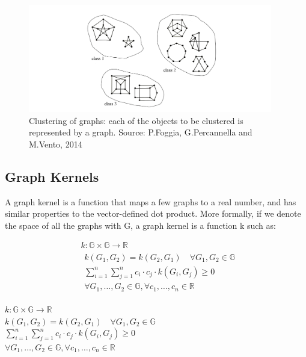 \begin{figure}[h]
\centering
\includegraphics[width=0.95\textwidth,center]{picture/figure6.png}
\caption[Miniaturtrichter]{Clustering of graphs: each of the objects to be clustered is represented by a graph. Source: P.Foggia, G.Percannella and M.Vento, 2014}
\label{fig:clusteringgraphs}
\end{figure}


\subsection{Graph Kernels}
A graph kernel is a function that maps a few graphs to a real number, and has similar properties to the vector-defined dot product. More formally, if we denote the space of all the graphs with G, a graph kernel is a function k such as:

\begin{equation}
\begin{aligned}
&k: \mathbb{G} \times \mathbb{G} \longrightarrow \mathbb{R}\\
&\begin{gathered}
k\left(G_{1}, G_{2}\right)=k\left(G_{2}, G_{1}\right) \quad \forall G_{1}, G_{2} \in \mathbb{G} \\
\sum_{i=1}^{n} \sum_{j=1}^{n} c_{i} \cdot c_{j} \cdot k\left(G_{i}, G_{j}\right) \geq 0 \\
\forall G_{1}, \ldots, G_{2} \in \mathbb{G}, \forall c_{1}, \ldots, c_{n} \in \mathbb{R}
\end{gathered}
\end{aligned}
\end{equation}

$k: \mathbb{G} \times \mathbb{G} \longrightarrow \mathbb{R}$ \\ $k\left(G_{1}, G_{2}\right)=k\left(G_{2}, G_{1}\right) \quad \forall G_{1}, G_{2} \in \mathbb{G}$ \\ $\sum_{i=1}^{n} \sum_{j=1}^{n} c_{i} \cdot c_{j} \cdot k\left(G_{i}, G_{j}\right) \geq 0$ \\ $\forall G_{1}, \ldots, G_{2} \in \mathbb{G}, \forall c_{1}, \ldots, c_{n} \in \mathbb{R}$

